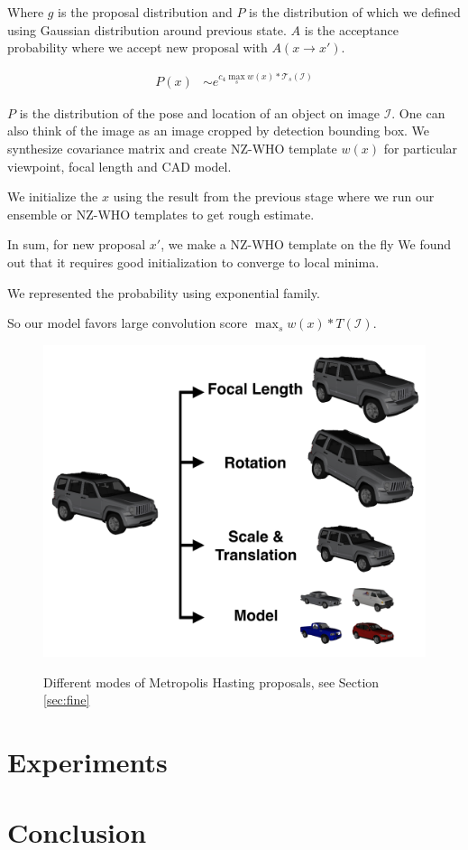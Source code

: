 \documentclass[10pt,twocolumn,letterpaper]{article}
\begin{document}
Where $g$ is the proposal distribution and $P$ is the distribution of which we
defined using Gaussian distribution around previous state. $A$ is the
acceptance probability where we accept new proposal with $A(x \rightarrow x')$.

\begin{align}
    P(x) & \sim e^{ c_4 \max_{s} w(x) \ast \mathcal{T}_s(\mathcal{I}) }
\end{align}

$P$ is the distribution of the pose and location of an object on image
$\mathcal{I}$. One can also think of the image as an image cropped by detection
bounding box. We synthesize covariance matrix and create NZ-WHO template $w(x)$ for particular viewpoint, focal length and CAD model.

We initialize the $x$ using the result from the previous stage where we run our ensemble or NZ-WHO templates to get rough estimate.

In sum, for new proposal $x'$, we make a NZ-WHO template on the fly 
We found out that it requires good initialization to converge to local minima. 

We represented the probability using exponential family. 

So our model favors large convolution score $\max_{s} w(x) \ast T(\mathcal{I})$. 
\begin{figure}[t]
\centering
    \includegraphics[width=0.7\linewidth]{tuning2} \\ [-5pt]
    \caption{Different modes of Metropolis Hasting proposals, see Section \ref{sec:fine}}
 \label{fig:tuningmode}
\end{figure}
    



\section{Experiments}
\label{sec:experiments}




\section{Conclusion}


{\small


}
\end{document}
